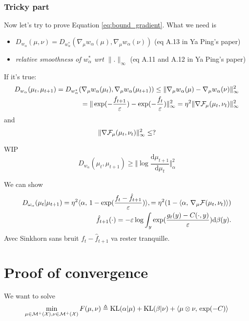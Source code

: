 \documentclass[a4paper, 10pt]{article}
\begin{document}
\subsubsection{Tricky part}
Now let's try to prove Equation \ref{eq:bound_gradient}. 
What we need is 
\begin{itemize}
	\item $D_{w_{\alpha}}(\mu,\nu)=D_{w_{\alpha}^*}(\nabla_{\mu}w_{\alpha}(\mu), \nabla_{\mu}w_{\alpha}(\nu))$ (eq A.13 in Ya Ping's paper)
	\item  \textit{relative smoothness of $w_{\alpha}^*$ wrt $\|.\|_{\infty}$} (eq A.11 and A.12 in Ya Ping's paper)
\end{itemize}
 If it's true:
\begin{align*}
D_{w_{\alpha}}(\mu_t,\mu_{t+1}) = D_{w_{\alpha}^*}(\nabla_{\mu}w_{\alpha}(\mu_t), \nabla_{\mu}w_{\alpha}(\mu_{t+1}))\le \| \nabla_{\mu}w_{\alpha}(\mu)- \nabla_{\mu}w_{\alpha}(\nu)\|^2_{\infty}\\
=\| \exp(-\frac{f_{t+1}}{\varepsilon})- \exp(-\frac{f_t}{\varepsilon})\|^2_{\infty} = \eta^2 \| \nabla \mathcal{F}_{\mu}(\mu_t,\nu_t)\|^2_{\infty}
\end{align*}
and 
\begin{align*}
\|\nabla \mathcal{F}_{\mu}(\mu_t,\nu_t)\|^2_{\infty}\le ?
\end{align*}

WIP
\begin{equation}
    D_{w_{\alpha}}(\mu_t,\mu_{t+1}) \geq
    \Vert \log \frac{\mathrm d \mu_{t+1}}{\mathrm d \mu_{t}} \Vert_\alpha^2
\end{equation}

We can show
\begin{align}
    D_{\omega_\alpha}(\mu_t | \mu_{t+1}) = \eta^2
    \langle \alpha,\,1 - \exp(\frac{f_t - \hat f_{t+1}}{\varepsilon})\rangle,
    = \eta^2 (1 - \langle \alpha,\,\nabla_\mu \mathcal{F}(\mu_t, \nu_t)\rangle)
    \\ \hat f_{t+1}(\cdot) 
    = - \varepsilon \log \int_y \exp(\frac{g_t(y) - C(\cdot, y)}{\varepsilon}) \mathrm d \beta(y).
\end{align}
Avec Sinkhorn sans bruit $f_t - \hat f_{t+1}$ va rester tranquille.

\section{Proof of convergence}

We want to solve
\begin{equation}
    \min_{\mu \in \mathcal{M}^+(\mathcal{X}), \nu \in \mathcal{M}^+(\mathcal{X})} 
    F(\mu, \nu) \triangleq \text{KL}(\alpha | \mu) + \text{KL}(\beta | \nu) + \langle \mu \otimes \nu,\,\exp(-C)\rangle
\end{equation}
\end{document}
